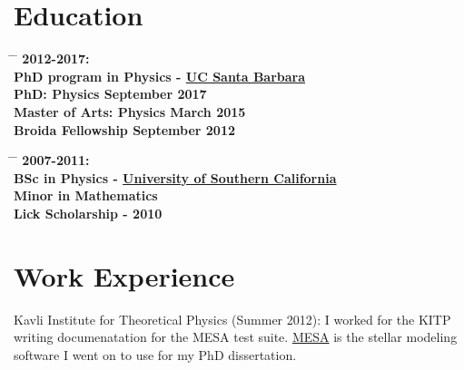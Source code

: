 \documentclass[10pt]{article} %
\begin{document}
\section{Education}
\parbox{0.5\textwidth}{ %
\begin{tabbing}
\hspace{3cm} \= \hspace{4cm} \= \kill
\bf{2012-2017:} \\
PhD program in Physics - \href{http://www.ucsb.edu}{UC Santa Barbara}\\[5pt]
\sqbullet\hspace{3mm}PhD: Physics \> \hspace{25mm}September 2017 \\
\sqbullet\hspace{3mm}Master of Arts: Physics \> \hspace{25mm}March \hspace{6mm} 2015 \\
\sqbullet\hspace{3mm}Broida Fellowship \> \hspace{25mm}September 2012
\end{tabbing}}
\hfill %
\parbox{0.5\textwidth}{ %
\begin{tabbing}
\hspace{3cm} \= \hspace{4cm} \= \kill
\bf{2007-2011:} \\
BSc in Physics - \href{http://www.usc.edu}{University of Southern California} \\[5pt]
\sqbullet\hspace{3mm}Minor in Mathematics\\
\sqbullet\hspace{3mm}Lick Scholarship - 2010
\end{tabbing}}


\section{Work Experience}

\jobb
{Kavli Institute for Theoretical Physics (Summer 2012):}
{I worked for the KITP writing documenatation for the MESA test suite.}
{\href{http://mesa.sourceforge.net/}{MESA} is the stellar modeling software I went on to use for my PhD dissertation.}
\end{document}
